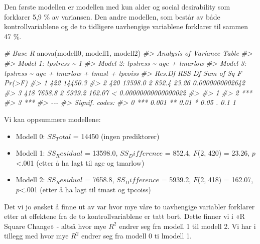 \documentclass[
]{article}
\newenvironment{Shaded}{\begin{snugshade}}{\end{snugshade}}
\newcommand{\CommentTok}[1]{\textcolor[rgb]{0.56,0.35,0.01}{\textit{#1}}}
\newcommand{\FunctionTok}[1]{\textcolor[rgb]{0.00,0.00,0.00}{#1}}
\newcommand{\NormalTok}[1]{#1}
\providecommand{\tightlist}{%
  \setlength{\itemsep}{0pt}\setlength{\parskip}{0pt}}
\begin{document}
Den første modellen er modellen med kun alder og social desirability som forklarer 5,9 \% av variansen. Den andre modellen, som består av både kontrollvariablene og de to tidligere uavhengige variablene forklarer til sammen 47 \%.

\begin{Shaded}
\begin{Highlighting}[]
\CommentTok{\# Base R}
\FunctionTok{anova}\NormalTok{(modell0, modell1, modell2)}
\CommentTok{\#\textgreater{} Analysis of Variance Table}
\CommentTok{\#\textgreater{} }
\CommentTok{\#\textgreater{} Model 1: tpstress \textasciitilde{} 1}
\CommentTok{\#\textgreater{} Model 2: tpstress \textasciitilde{} age + tmarlow}
\CommentTok{\#\textgreater{} Model 3: tpstress \textasciitilde{} age + tmarlow + tmast + tpcoiss}
\CommentTok{\#\textgreater{}   Res.Df     RSS Df Sum of Sq      F                Pr(\textgreater{}F)}
\CommentTok{\#\textgreater{} 1    422 14450.3                                          }
\CommentTok{\#\textgreater{} 2    420 13598.0  2     852.4  23.26       0.0000000002642}
\CommentTok{\#\textgreater{} 3    418  7658.8  2    5939.2 162.07 \textless{} 0.00000000000000022}
\CommentTok{\#\textgreater{}      }
\CommentTok{\#\textgreater{} 1    }
\CommentTok{\#\textgreater{} 2 ***}
\CommentTok{\#\textgreater{} 3 ***}
\CommentTok{\#\textgreater{} {-}{-}{-}}
\CommentTok{\#\textgreater{} Signif. codes:  }
\CommentTok{\#\textgreater{} 0 \textquotesingle{}***\textquotesingle{} 0.001 \textquotesingle{}**\textquotesingle{} 0.01 \textquotesingle{}*\textquotesingle{} 0.05 \textquotesingle{}.\textquotesingle{} 0.1 \textquotesingle{} \textquotesingle{} 1}
\end{Highlighting}
\end{Shaded}

Vi kan oppsummere modellene:

\begin{itemize}
\tightlist
\item
  Modell 0: \(SS_Total\) = 14450 (ingen prediktorer)
\item
  Modell 1: \(SS_Residual\) = 13598.0, \(SS_Difference\) = 852.4, \(F\)(2, 420) = 23.26, \(p\)\textless.001 (etter å ha lagt til age og tmarlow)
\item
  Modell 2: \(SS_Residual\) = 7658.8, \(SS_Difference\) = 5939.2, \(F\)(2, 418) = 162.07, \(p\)\textless.001 (etter å ha lagt til tmast og tpcoiss)
\end{itemize}

Det vi jo ønsket å finne ut av var hvor mye våre to uavhengige variabler forklarer etter at effektene fra de to kontrollvariablene er tatt bort. Dette finner vi i «R Square Change» - altså hvor mye \(R^2\) endrer seg fra modell 1 til modell 2. Vi har i tillegg med hvor mye \(R^2\) endrer seg fra modell 0 ti lmodell 1.
\end{document}
